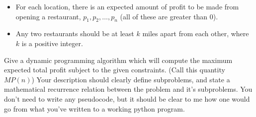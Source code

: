 \documentclass[12pt]{article}
\begin{document}
\begin{enumerate}
    \begin{itemize}
        \item For each location, there is an expected amount of profit to be made from opening a restaurant, $p_1, p_2, \ldots, p_n$ (all of these are greater than $0$).
        \item Any two restaurants should be at least $k$ miles apart from each other, where $k$ is a positive integer. 
    \end{itemize} 
    Give a dynamic programming algorithm which will compute the maximum expected total profit subject to the given constraints. (Call this quantity $MP(n)$) Your description should clearly define subproblems, and state a mathematical recurrence relation between the problem and it's subproblems. You don't need to write any pseudocode, but it should be clear to me how one would go from what you've written to a working python program. 
\end{enumerate}
\end{document}
